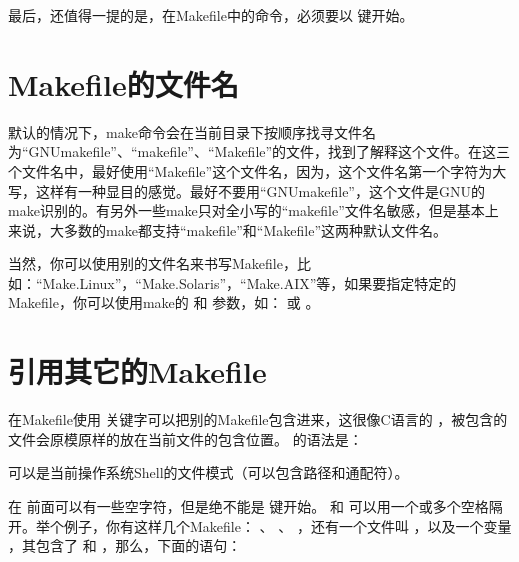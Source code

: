 \documentclass[a4paper,10pt]{sphinxmanual}
\begin{document}
最后，还值得一提的是，在Makefile中的命令，必须要以  键开始。


\section{Makefile的文件名}
\label{\detokenize{introduction:id7}}
默认的情况下，make命令会在当前目录下按顺序找寻文件名为“GNUmakefile”、“makefile”、“Makefile”的文件，找到了解释这个文件。在这三个文件名中，最好使用“Makefile”这个文件名，因为，这个文件名第一个字符为大写，这样有一种显目的感觉。最好不要用“GNUmakefile”，这个文件是GNU的make识别的。有另外一些make只对全小写的“makefile”文件名敏感，但是基本上来说，大多数的make都支持“makefile”和“Makefile”这两种默认文件名。

当然，你可以使用别的文件名来书写Makefile，比如：“Make.Linux”，“Make.Solaris”，“Make.AIX”等，如果要指定特定的Makefile，你可以使用make的  和  参数，如：  或  。


\section{引用其它的Makefile}
\label{\detokenize{introduction:id8}}
在Makefile使用  关键字可以把别的Makefile包含进来，这很像C语言的
 ，被包含的文件会原模原样的放在当前文件的包含位置。  的语法是：

\begin{sphinxVerbatim}[commandchars=\\\{\}]
\end{sphinxVerbatim}

 可以是当前操作系统Shell的文件模式（可以包含路径和通配符）。

在  前面可以有一些空字符，但是绝不能是  键开始。  和
 可以用一个或多个空格隔开。举个例子，你有这样几个Makefile：  、
 、  ，还有一个文件叫  ，以及一个变量  ，其包含了  和  ，那么，下面的语句：
\end{document}
